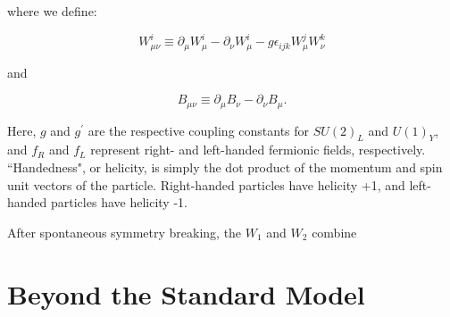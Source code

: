 where we define:

\begin{equation}
W^{i}_{\mu\nu} \equiv \partial_{\mu}W^{i}_{\mu} - \partial_{\nu}W^{i}_{\mu} - g\epsilon_{ijk}W^{j}_{\mu}W^{k}_{\nu}
\end{equation}

and

\begin{equation}
B_{\mu\nu} \equiv \partial_{\mu}B_{\nu} - \partial_{\nu}B_{\mu}.
\end{equation}

Here, $g$ and $g^{\prime}$ are the respective coupling constants for $SU(2)_{L}$ and $U(1)_{Y}$, and $f_{R}$ and $f_{L}$ represent right- and left-handed fermionic fields, respectively. ``Handedness", or helicity, is simply the dot product of the momentum and spin unit vectors of the particle. Right-handed particles have helicity +1, and left-handed particles have helicity -1.

After spontaneous symmetry breaking, the $W_{1}$ and $W_{2}$ combine

\chapter{Beyond the Standard Model}


